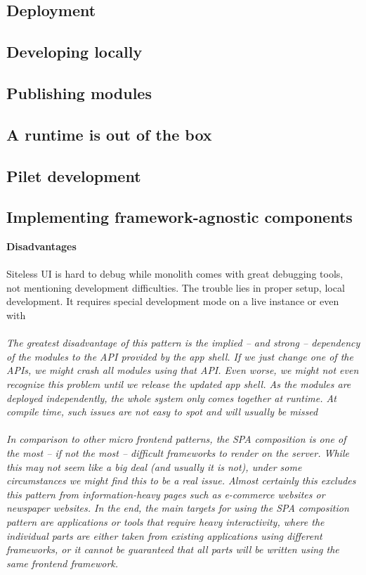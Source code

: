 \documentclass[a4paper]{book}
\begin{document}
\subsection{Deployment}
\subsection{Developing locally}
\subsection{Publishing modules}
\subsection{A runtime is out of the box}
\subsection{Pilet development}
\subsection{Implementing framework-agnostic components}

\textbf{Disadvantages}
\\ \\
Siteless UI is hard to debug while monolith comes with great debugging tools, not mentioning development difficulties. The trouble lies in proper setup, local development. It requires special development mode on a live instance or even with \\ \\ 
\textit{The greatest disadvantage of this pattern is the implied – and strong – dependency of the modules to the API provided by the app shell. If we just change one of the APIs, we might crash all modules using that API. Even worse, we might not even recognize this problem until we release the updated app shell. As the modules are deployed independently, the whole system only comes together at runtime. At compile time, such issues are not easy to spot and will usually be missed
\\ \\ 
In comparison to other micro frontend patterns, the SPA composition is one of the most – if not the most – difficult frameworks to render on the server. While this may not seem like a big deal (and usually it is not), under some circumstances we might find this to be a real issue. Almost certainly this excludes this pattern from information-heavy pages such as e-commerce websites or newspaper websites. In the end, the main targets for using the SPA composition pattern are applications or tools that require heavy interactivity, where the individual parts are either taken from existing applications using different frameworks, or it cannot be guaranteed that all parts will be written using the same frontend framework.
}
\end{document}

